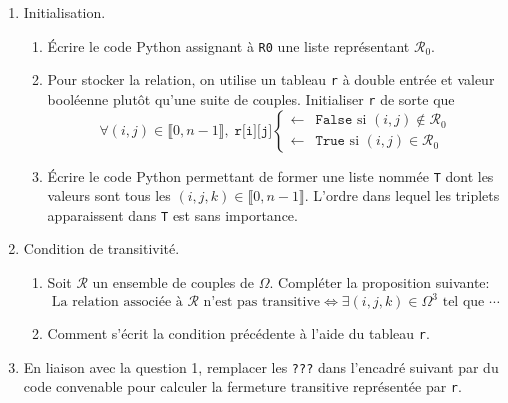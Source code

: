 \begin{enumerate}
  \item Initialisation.
\begin{enumerate}
  \item \'Ecrire le code Python assignant à \texttt{R0} une liste représentant $\mathcal{R}_0$.
  \item Pour stocker la relation, on utilise un tableau \texttt{r} à double entrée et valeur booléenne plutôt qu'une suite de couples. Initialiser \texttt{r} de sorte que
  \begin{displaymath}
    \forall(i,j)\in \llbracket 0, n-1\rrbracket,\;
\texttt{r[i][j]} 
\left\lbrace 
\begin{aligned}
  \leftarrow &\texttt{False} \text{ si } (i,j)\notin \mathcal{R}_0 \\
  \leftarrow &\texttt{True} \text{ si } (i,j)\in \mathcal{R}_0
\end{aligned}
\right. 
  \end{displaymath}
  \item \'Ecrire le code Python permettant de former une liste nommée \texttt{T} dont les valeurs sont tous les $(i,j,k)\in \llbracket 0, n-1\rrbracket$. L'ordre dans lequel les triplets apparaissent dans \texttt{T} est sans importance. 
\end{enumerate}

\item Condition de transitivité.
\begin{enumerate}
\item Soit $\mathcal{R}$ un ensemble de couples de $\Omega$. Compléter la proposition suivante:
\begin{displaymath}
  \text{La relation associée à $\mathcal{R}$ n'est pas transitive} \Leftrightarrow \exists (i,j,k) \in \Omega^3 \text{ tel que } \cdots
\end{displaymath}
\item Comment s'écrit la condition précédente à l'aide du tableau \texttt{r}.
\end{enumerate}

\item En liaison avec la question 1, remplacer les \texttt{???} dans l'encadré suivant par du code convenable pour calculer la fermeture transitive représentée par \texttt{r}.

\end{enumerate}
